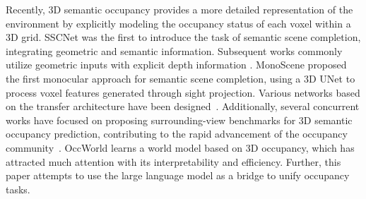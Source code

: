 Recently, 3D semantic occupancy provides a more detailed representation of the environment by explicitly modeling the occupancy status of each voxel within a 3D grid. SSCNet \cite{song2017semantic} was the first to introduce the task of semantic scene completion, integrating geometric and semantic information. Subsequent works commonly utilize geometric inputs with explicit depth information \cite{lmscnet, aicnet, js3cnet, sketch}. MonoScene \cite{cao2022monoscene} proposed the first monocular approach for semantic scene completion, using a 3D UNet \cite{ronneberger2015u} to process voxel features generated through sight projection. Various networks based on the transfer architecture have been designed~\cite{huang2023tri,huang2023tri,Zhang_2023_ICCV}. Additionally, several concurrent works have focused on proposing surrounding-view benchmarks for 3D semantic occupancy prediction, contributing to the rapid advancement of the occupancy community~\cite{wang2023openoccupancy,wang2023openoccupancy, wei2023surroundocc, tong2023scene, tian2023occ3d}. OccWorld learns a world model based on 3D occupancy, which has attracted much attention with its interpretability and efficiency. Further, this paper attempts to use the large language model as a bridge to unify occupancy tasks.



